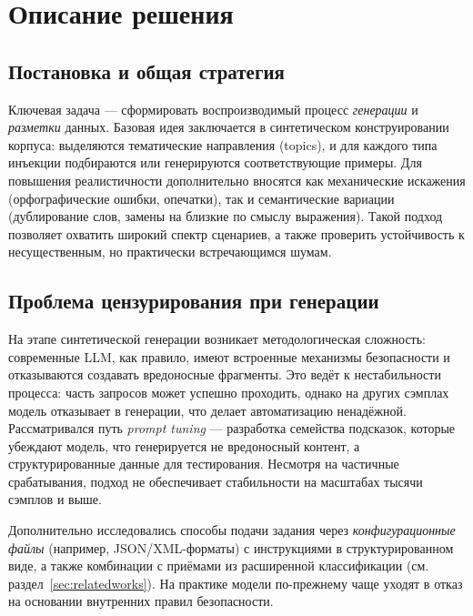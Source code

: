 
\section{Описание решения}
\label{sec:solution}

\subsection{Постановка и общая стратегия}
Ключевая задача --- сформировать воспроизводимый процесс \emph{генерации} и \emph{разметки} данных. Базовая идея заключается в синтетическом конструировании корпуса: выделяются тематические направления (topics), и для каждого типа инъекции подбираются или генерируются соответствующие примеры. Для повышения реалистичности дополнительно вносятся как механические искажения (орфографические ошибки, опечатки), так и семантические вариации (дублирование слов, замены на близкие по смыслу выражения). Такой подход позволяет охватить широкий спектр сценариев, а также проверить устойчивость к несущественным, но практически встречающимся шумам.

\subsection{Проблема цензурирования при генерации}
На этапе синтетической генерации возникает методологическая сложность: современные LLM, как правило, имеют встроенные механизмы безопасности и отказываются создавать вредоносные фрагменты. Это ведёт к нестабильности процесса: часть запросов может успешно проходить, однако на других сэмплах модель отказывает в генерации, что делает автоматизацию ненадёжной. Рассматривался путь \emph{prompt tuning} --- разработка семейства подсказок, которые убеждают модель, что генерируется не вредоносный контент, а структурированные данные для тестирования. Несмотря на частичные срабатывания, подход не обеспечивает стабильности на масштабах тысячи сэмплов и выше.

Дополнительно исследовались способы подачи задания через \emph{конфигурационные файлы} (например, JSON/XML-форматы) с инструкциями в структурированном виде, а также комбинации с приёмами из расширенной классификации (см. раздел~\ref{sec:relatedworks}). На практике модели по-прежнему чаще уходят в отказ на основании внутренних правил безопасности.

